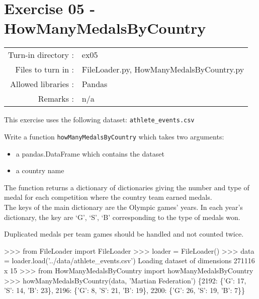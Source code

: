\documentclass[]{article}
\newenvironment{Shaded}{\begin{snugshade}}{\end{snugshade}}
\newcommand{\DecValTok}[1]{\textcolor[rgb]{0.96,0.45,0.00}{#1}}
\newcommand{\ImportTok}[1]{\textcolor[rgb]{0.15,0.68,0.38}{#1}}
\newcommand{\NormalTok}[1]{\textcolor[rgb]{0.81,0.81,0.76}{#1}}
\newcommand{\OperatorTok}[1]{\textcolor[rgb]{0.81,0.81,0.76}{#1}}
\newcommand{\StringTok}[1]{\textcolor[rgb]{0.96,0.31,0.31}{#1}}
\begin{document}
\clearpage

\hypertarget{exercise-05---howmanymedalsbycountry-1}{%
\section{Exercise 05 -
HowManyMedalsByCountry}\label{exercise-05---howmanymedalsbycountry-1}}

\begin{longtable}[]{@{}rl@{}}
\toprule
\endhead
Turn-in directory : & ex05\tabularnewline
Files to turn in : & FileLoader.py,
HowManyMedalsByCountry.py\tabularnewline
Allowed libraries : & Pandas\tabularnewline
Remarks : & n/a\tabularnewline
\bottomrule
\end{longtable}

This exercise uses the following dataset: \texttt{athlete\_events.csv}

Write a function \texttt{howManyMedalsByCountry} which takes two
arguments:

\begin{itemize}
\item
  a pandas.DataFrame which contains the dataset
\item
  a country name
\end{itemize}

The function returns a dictionary of dictionaries giving the number and
type of medal for each competition where the country team earned
medals.\\
The keys of the main dictionary are the Olympic games' years. In each
year's dictionary, the key are `G', `S', `B' corresponding to the type
of medals won.

Duplicated medals per team games should be handled and not counted
twice.

\begin{Shaded}
\begin{Highlighting}[]
\OperatorTok{>>>} \ImportTok{from}\NormalTok{ FileLoader }\ImportTok{import}\NormalTok{ FileLoader}
\OperatorTok{>>>}\NormalTok{ loader }\OperatorTok{=}\NormalTok{ FileLoader()}
\OperatorTok{>>>}\NormalTok{ data }\OperatorTok{=}\NormalTok{ loader.load(}\StringTok{'../data/athlete_events.csv'}\NormalTok{)}
\NormalTok{Loading dataset of dimensions }\DecValTok{271116}\NormalTok{ x }\DecValTok{15}
\OperatorTok{>>>} \ImportTok{from}\NormalTok{ HowManyMedalsByCountry }\ImportTok{import}\NormalTok{ howManyMedalsByCountry}
\OperatorTok{>>>}\NormalTok{ howManyMedalsByCountry(data, }\StringTok{'Martian Federation'}\NormalTok{)}
\NormalTok{\{}\DecValTok{2192}\NormalTok{: \{}\StringTok{'G'}\NormalTok{: }\DecValTok{17}\NormalTok{, }\StringTok{'S'}\NormalTok{: }\DecValTok{14}\NormalTok{, }\StringTok{'B'}\NormalTok{: }\DecValTok{23}\NormalTok{\}, }\DecValTok{2196}\NormalTok{: \{}\StringTok{'G'}\NormalTok{: }\DecValTok{8}\NormalTok{, }\StringTok{'S'}\NormalTok{: }\DecValTok{21}\NormalTok{, }\StringTok{'B'}\NormalTok{: }\DecValTok{19}\NormalTok{\}, }\DecValTok{2200}\NormalTok{: \{}\StringTok{'G'}\NormalTok{: }\DecValTok{26}\NormalTok{, }\StringTok{'S'}\NormalTok{: }\DecValTok{19}\NormalTok{, }\StringTok{'B'}\NormalTok{: }\DecValTok{7}\NormalTok{\}\}}
\end{Highlighting}
\end{Shaded}
\end{document}
